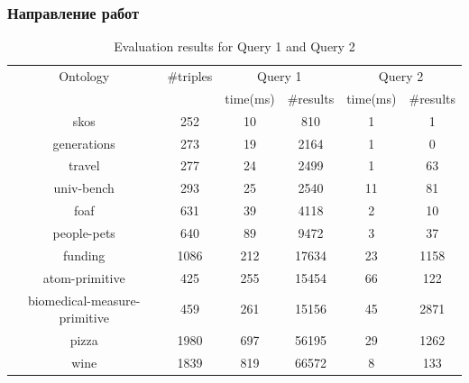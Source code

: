 \documentclass{beamer}
\begin{document}
\begin{frame}
        \frametitle{Направление работ}
\begin{table}[t]
\centering
\caption{Evaluation results for Query 1 and Query 2}
\label{tbl1}

\begin{tabular}{ | c | c | c | c | c | c |}
\hline
Ontology & \#triples & \multicolumn{2}{|c|}{Query 1} & \multicolumn{2}{|c|}{Query 2} \\
\cline{3-6}
& & time(ms) & \#results & time(ms) & \#results \\
\hline 
\hline
skos        & 252 & 10 & 810 & 1 & 1 \\
generations & 273 & 19 & 2164 & 1 & 0 \\
travel      & 277 & 24 & 2499 & 1 & 63 \\
univ-bench  & 293 & 25 & 2540 & 11 & 81 \\
foaf        & 631 & 39 & 4118 & 2 & 10 \\
people-pets & 640 & 89 & 9472 & 3 & 37 \\
funding     & 1086 & 212 & 17634 & 23 & 1158 \\
atom-primitive & 425 & 255 & 15454 & 66 & 122 \\
biomedical-measure-primitive & 459 & 261 & 15156 & 45 & 2871 \\
pizza       & 1980 & 697 & 56195 & 29 & 1262 \\
wine        & 1839 & 819 & 66572 & 8 & 133 \\
\hline
\end{tabular}

\end{table}
    \end{frame}
\end{document}
